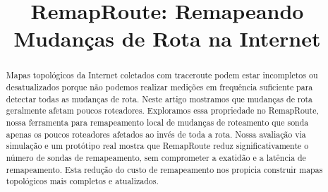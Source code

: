 \documentclass{JBCS}
\newcommand{\rmprt}{{Re\-map\-Rou\-te}}
\begin{document}
 

\setcounter{page}{01}


\title{RemapRoute: Remapeando Mudanças de Rota na Internet}
\thankstitle{}



\nameb{}
\addressb{}

\namec{}
\addressc{}

\named{}
\addressd{}


\maketitle

% 

\begin{abstract} 
%
Mapas topológicos da Internet coletados com traceroute podem estar
incompletos ou desatualizados porque não podemos realizar medições em
frequência suficiente para detectar todas as mudanças de rota.  Neste
artigo mostramos que mudanças de rota geralmente afetam poucos
roteadores.  Exploramos essa propriedade no \rmprt{}, nossa ferramenta
para remapeamento local de mudanças de roteamento que sonda apenas os
poucos roteadores afetados ao invés de toda a rota.  Nossa avaliação via
simulação e um protótipo real mostra que \rmprt{} reduz
significativamente o número de sondas de remapeamento, sem comprometer a
exatidão e a latência de remapeamento.  Esta redução do custo de
remapeamento nos propicia construir mapas topológicos mais completos e
atualizados.
%
\end{abstract}
\end{document}
